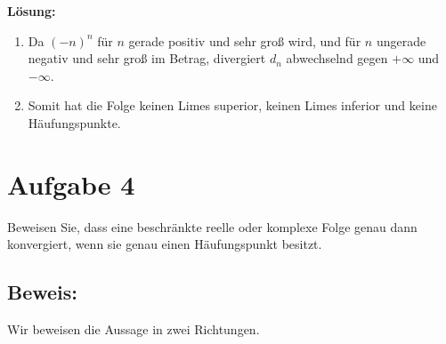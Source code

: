\documentclass[11pt]{article}
\begin{document}
\textbf{Lösung:}
\begin{enumerate}
    \item Da \( (-n)^n \) für \( n \) gerade positiv und sehr groß wird, und für \( n \) ungerade negativ und sehr groß im Betrag, divergiert \( d_n \) abwechselnd gegen \( +\infty \) und \( -\infty \).
    \item Somit hat die Folge keinen Limes superior, keinen Limes inferior und keine Häufungspunkte.
\end{enumerate}


\section*{Aufgabe 4}

Beweisen Sie, dass eine beschränkte reelle oder komplexe Folge genau dann konvergiert, wenn sie genau einen Häufungspunkt besitzt.

\subsection*{Beweis:}

Wir beweisen die Aussage in zwei Richtungen.
\end{document}
